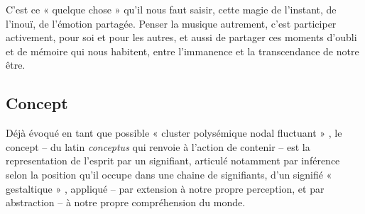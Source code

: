 \documentclass{article}
\begin{document}
C'est ce « quelque chose » qu'il nous faut saisir, cette magie de l'instant, de l'inouï, de l'émotion partagée. Penser la musique autrement, c'est participer activement, pour soi et pour les autres, et aussi de partager ces moments d'oubli et de mémoire qui nous habitent, entre l'immanence et la transcendance de notre être.



\subsection*{Concept} %

Déjà évoqué en tant que possible « cluster polysémique nodal fluctuant »%
, le concept -- du latin \textit{conceptus} qui renvoie à l'action de contenir -- est la representation de l'esprit par un signifiant, articulé notamment par inférence selon la position qu’il occupe dans une chaine de signifiants, d'un signifié « gestaltique »%
, appliqué -- par extension à notre propre perception, et par abstraction -- à notre propre compréhension du monde. 

\bigskip 
\end{document}
